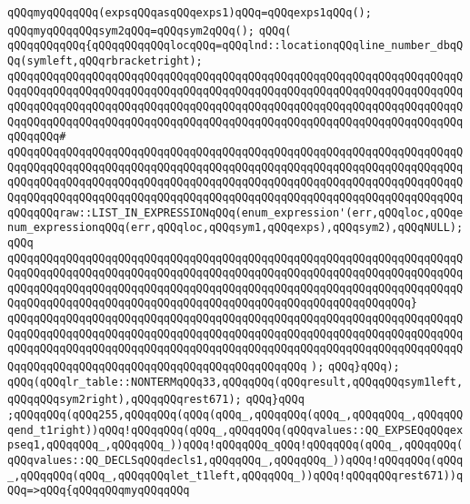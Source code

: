 \verb|qQQqmyqQQqqQQq(expsqQQqasqQQqexps1)qQQq=qQQqexps1qQQq();|\newline
\verb|qQQqmyqQQqqQQqsym2qQQq=qQQqsym2qQQq();|\newline
\verb|qQQq(|\newline
\verb|qQQqqQQqqQQq{qQQqqQQqqQQqlocqQQq=qQQqlnd::locationqQQqline_number_dbqQQq(symleft,qQQqrbracketright);|\newline
\verb|qQQqqQQqqQQqqQQqqQQqqQQqqQQqqQQqqQQqqQQqqQQqqQQqqQQqqQQqqQQqqQQqqQQqqQQqqQQqqQQqqQQqqQQqqQQqqQQqqQQqqQQqqQQqqQQqqQQqqQQqqQQqqQQqqQQqqQQqqQQqqQQqqQQqqQQqqQQqqQQqqQQqqQQqqQQqqQQqqQQqqQQqqQQqqQQqqQQqqQQqqQQqqQQqqQQqqQQqqQQqqQQqqQQqqQQqqQQqqQQqqQQqqQQqqQQqqQQqqQQqqQQqqQQqqQQqqQQqqQQqqQQqqQQq#|\newline
\verb|qQQqqQQqqQQqqQQqqQQqqQQqqQQqqQQqqQQqqQQqqQQqqQQqqQQqqQQqqQQqqQQqqQQqqQQqqQQqqQQqqQQqqQQqqQQqqQQqqQQqqQQqqQQqqQQqqQQqqQQqqQQqqQQqqQQqqQQqqQQqqQQqqQQqqQQqqQQqqQQqqQQqqQQqqQQqqQQqqQQqqQQqqQQqqQQqqQQqqQQqqQQqqQQqqQQqqQQqqQQqqQQqqQQqqQQqqQQqqQQqqQQqqQQqqQQqqQQqqQQqqQQqqQQqqQQqqQQqqQQqqQQqqQQqraw::LIST_IN_EXPRESSIONqQQq(enum_expression'(err,qQQqloc,qQQqenum_expressionqQQq(err,qQQqloc,qQQqsym1,qQQqexps),qQQqsym2),qQQqNULL);qQQq|\newline
\verb|qQQqqQQqqQQqqQQqqQQqqQQqqQQqqQQqqQQqqQQqqQQqqQQqqQQqqQQqqQQqqQQqqQQqqQQqqQQqqQQqqQQqqQQqqQQqqQQqqQQqqQQqqQQqqQQqqQQqqQQqqQQqqQQqqQQqqQQqqQQqqQQqqQQqqQQqqQQqqQQqqQQqqQQqqQQqqQQqqQQqqQQqqQQqqQQqqQQqqQQqqQQqqQQqqQQqqQQqqQQqqQQqqQQqqQQqqQQqqQQqqQQqqQQqqQQqqQQqqQQqqQQqqQQqqQQq}|\newline
\verb|qQQqqQQqqQQqqQQqqQQqqQQqqQQqqQQqqQQqqQQqqQQqqQQqqQQqqQQqqQQqqQQqqQQqqQQqqQQqqQQqqQQqqQQqqQQqqQQqqQQqqQQqqQQqqQQqqQQqqQQqqQQqqQQqqQQqqQQqqQQqqQQqqQQqqQQqqQQqqQQqqQQqqQQqqQQqqQQqqQQqqQQqqQQqqQQqqQQqqQQqqQQqqQQqqQQqqQQqqQQqqQQqqQQqqQQqqQQqqQQqqQQqqQQqqQQqqQQq|\newline
\verb|);|\newline
\verb|qQQq}qQQq);|\newline
\verb|qQQq(qQQqlr_table::NONTERMqQQq33,qQQqqQQq(qQQqresult,qQQqqQQqsym1left,qQQqqQQqsym2right),qQQqqQQqrest671);|\newline
\verb|qQQq}qQQq|\newline
\verb|;qQQqqQQq(qQQq255,qQQqqQQq(qQQq(qQQq_,qQQqqQQq(qQQq_,qQQqqQQq_,qQQqqQQqend_t1right))qQQq!qQQqqQQq(qQQq_,qQQqqQQq(qQQqvalues::QQ_EXPSEQqQQqexpseq1,qQQqqQQq_,qQQqqQQq_))qQQq!qQQqqQQq_qQQq!qQQqqQQq(qQQq_,qQQqqQQq(qQQqvalues::QQ_DECLSqQQqdecls1,qQQqqQQq_,qQQqqQQq_))qQQq!qQQqqQQq(qQQq_,qQQqqQQq(qQQq_,qQQqqQQqlet_t1left,qQQqqQQq_))qQQq!qQQqqQQqrest671))qQQq=>qQQq{qQQqqQQqmyqQQqqQQq|\newline
